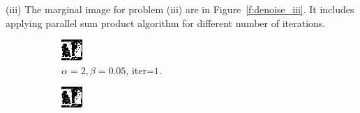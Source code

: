 \documentclass{article}
\begin{document}
\noindent
(iii) The marginal image for problem (iii) are in Figure~\ref{f:denoise_iii}.
It includes applying parallel sum product algorithm for different number
of iterations.
\begin{figure}[t]
\centering
\begin{subfigure}[t]{0.27\textwidth}
  \centering
  \includegraphics[width=\textwidth]{iii_alpha_2_beta_0.05_iterations_2.bmp}
  \vspace{-0.6cm}
  \caption{$\alpha=2, \beta=0.05$, iter=$1$.}
\end{subfigure}
\begin{subfigure}[t]{0.27\textwidth}
  \centering
  \includegraphics[width=\textwidth]{iii_alpha_2_beta_0.2_iterations_2.bmp}

\end{subfigure}
\end{figure}
\end{document}

